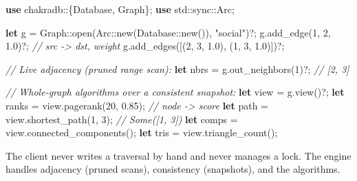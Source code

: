 \documentclass[
  11pt,
  openany]{book}
\newenvironment{Shaded}{}{}
\newcommand{\CommentTok}[1]{\textcolor[rgb]{0.38,0.63,0.69}{\textit{#1}}}
\newcommand{\DecValTok}[1]{\textcolor[rgb]{0.25,0.63,0.44}{#1}}
\newcommand{\KeywordTok}[1]{\textcolor[rgb]{0.00,0.44,0.13}{\textbf{#1}}}
\newcommand{\NormalTok}[1]{#1}
\newcommand{\OperatorTok}[1]{\textcolor[rgb]{0.40,0.40,0.40}{#1}}
\newcommand{\PreprocessorTok}[1]{\textcolor[rgb]{0.74,0.48,0.00}{#1}}
\newcommand{\StringTok}[1]{\textcolor[rgb]{0.25,0.44,0.63}{#1}}
\begin{document}
\begin{Shaded}
\begin{Highlighting}[]
\KeywordTok{use} \PreprocessorTok{chakradb::}\OperatorTok{\{}\NormalTok{Database}\OperatorTok{,}\NormalTok{ Graph}\OperatorTok{\};}
\KeywordTok{use} \PreprocessorTok{std::sync::}\NormalTok{Arc}\OperatorTok{;}

\KeywordTok{let}\NormalTok{ g }\OperatorTok{=} \PreprocessorTok{Graph::}\NormalTok{open(}\PreprocessorTok{Arc::}\NormalTok{new(}\PreprocessorTok{Database::}\NormalTok{new())}\OperatorTok{,} \StringTok{"social"}\NormalTok{)}\OperatorTok{?;}
\NormalTok{g}\OperatorTok{.}\NormalTok{add\_edge(}\DecValTok{1}\OperatorTok{,} \DecValTok{2}\OperatorTok{,} \DecValTok{1.0}\NormalTok{)}\OperatorTok{?;}                 \CommentTok{// src {-}\textgreater{} dst, weight}
\NormalTok{g}\OperatorTok{.}\NormalTok{add\_edges([(}\DecValTok{2}\OperatorTok{,} \DecValTok{3}\OperatorTok{,} \DecValTok{1.0}\NormalTok{)}\OperatorTok{,}\NormalTok{ (}\DecValTok{1}\OperatorTok{,} \DecValTok{3}\OperatorTok{,} \DecValTok{1.0}\NormalTok{)])}\OperatorTok{?;}

\CommentTok{// Live adjacency (pruned range scan):}
\KeywordTok{let}\NormalTok{ nbrs }\OperatorTok{=}\NormalTok{ g}\OperatorTok{.}\NormalTok{out\_neighbors(}\DecValTok{1}\NormalTok{)}\OperatorTok{?;}         \CommentTok{// [2, 3]}

\CommentTok{// Whole{-}graph algorithms over a consistent snapshot:}
\KeywordTok{let}\NormalTok{ view   }\OperatorTok{=}\NormalTok{ g}\OperatorTok{.}\NormalTok{view()}\OperatorTok{?;}
\KeywordTok{let}\NormalTok{ ranks  }\OperatorTok{=}\NormalTok{ view}\OperatorTok{.}\NormalTok{pagerank(}\DecValTok{20}\OperatorTok{,} \DecValTok{0.85}\NormalTok{)}\OperatorTok{;}   \CommentTok{// node {-}\textgreater{} score}
\KeywordTok{let}\NormalTok{ path   }\OperatorTok{=}\NormalTok{ view}\OperatorTok{.}\NormalTok{shortest\_path(}\DecValTok{1}\OperatorTok{,} \DecValTok{3}\NormalTok{)}\OperatorTok{;}  \CommentTok{// Some([1, 3])}
\KeywordTok{let}\NormalTok{ comps  }\OperatorTok{=}\NormalTok{ view}\OperatorTok{.}\NormalTok{connected\_components()}\OperatorTok{;}
\KeywordTok{let}\NormalTok{ tris   }\OperatorTok{=}\NormalTok{ view}\OperatorTok{.}\NormalTok{triangle\_count()}\OperatorTok{;}
\end{Highlighting}
\end{Shaded}

The client never writes a traversal by hand and never manages a lock.
The engine handles adjacency (pruned scans), consistency (snapshots),
and the algorithms.
\end{document}
